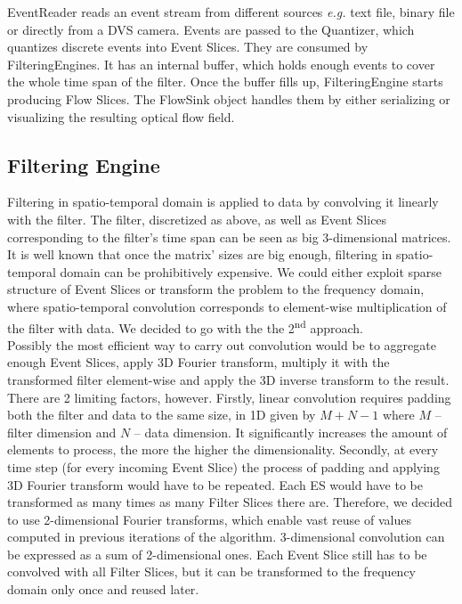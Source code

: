 EventReader reads an event stream from different sources \emph{e.g.} text file, binary file or directly from a DVS camera.
Events are passed to the Quantizer, which quantizes discrete events into Event Slices.
They are consumed by FilteringEngines. It has an internal buffer, which holds enough events to cover the whole time span of the filter. 
Once the buffer fills up, FilteringEngine starts producing Flow Slices.
The FlowSink object handles them by either serializing or visualizing the resulting optical flow field.

\subsection{Filtering Engine}

Filtering in spatio-temporal domain is applied to data by convolving it linearly with the filter.
The filter, discretized as above, as well as Event Slices corresponding to the filter's time span can be seen as big 3-dimensional matrices.
It is well known that once the matrix' sizes are big enough, filtering in spatio-temporal domain can be prohibitively expensive.
We could either exploit sparse structure of Event Slices or transform the problem to the frequency domain, where spatio-temporal convolution corresponds to element-wise multiplication of the filter with data.
We decided to go with the the 2\textsuperscript{nd} approach.
\\

Possibly the most efficient way to carry out convolution would be to aggregate enough Event Slices, apply 3D Fourier transform, multiply it with the transformed filter element-wise and apply the 3D inverse transform to the result.
There are 2 limiting factors, however.
Firstly, linear convolution requires padding both the filter and data to the same size, in 1D given by $M+N-1$ where $M$ -- filter dimension and $N$ -- data dimension.
It significantly increases the amount of elements to process, the more the higher the dimensionality.
Secondly, at every time step (for every incoming Event Slice) the process of padding and applying 3D Fourier transform would have to be repeated.
Each ES would have to be transformed as many times as many Filter Slices there are.
Therefore, we decided to use 2-dimensional Fourier transforms, which enable vast reuse of values computed in previous iterations of the algorithm.
3-dimensional convolution can be expressed as a sum of 2-dimensional ones.
Each Event Slice still has to be convolved with all Filter Slices, but it can be transformed to the frequency domain only once and reused later.

